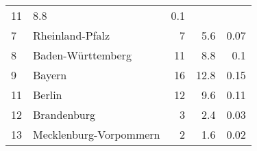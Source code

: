\begin{longtable}{lXrrr}
       \num{11} &
       \num[round-mode=places,round-precision=2]{8,8} &
         \num[round-mode=places,round-precision=2]{0,1} \\

     7 &
     \multicolumn{1}{X}{ Rheinland-Pfalz   } &


       \num{7} &
       \num[round-mode=places,round-precision=2]{5,6} &
         \num[round-mode=places,round-precision=2]{0,07} \\

     8 &
     \multicolumn{1}{X}{ Baden-Württemberg   } &


       \num{11} &
       \num[round-mode=places,round-precision=2]{8,8} &
         \num[round-mode=places,round-precision=2]{0,1} \\

     9 &
     \multicolumn{1}{X}{ Bayern   } &


       \num{16} &
       \num[round-mode=places,round-precision=2]{12,8} &
         \num[round-mode=places,round-precision=2]{0,15} \\

     11 &
     \multicolumn{1}{X}{ Berlin   } &


       \num{12} &
       \num[round-mode=places,round-precision=2]{9,6} &
         \num[round-mode=places,round-precision=2]{0,11} \\

     12 &
     \multicolumn{1}{X}{ Brandenburg   } &


       \num{3} &
       \num[round-mode=places,round-precision=2]{2,4} &
         \num[round-mode=places,round-precision=2]{0,03} \\

     13 &
     \multicolumn{1}{X}{ Mecklenburg-Vorpommern   } &


       \num{2} &
       \num[round-mode=places,round-precision=2]{1,6} &
         \num[round-mode=places,round-precision=2]{0,02} \\


\end{longtable}
